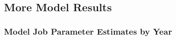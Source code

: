 \documentclass[11pt]{article}
\begin{document}




\subsection{More Model Results} \label{modelresults}
\subsubsection{Model Job Parameter Estimates by Year}

\clearpage

\clearpage

\clearpage

\clearpage

\clearpage

\end{document}
